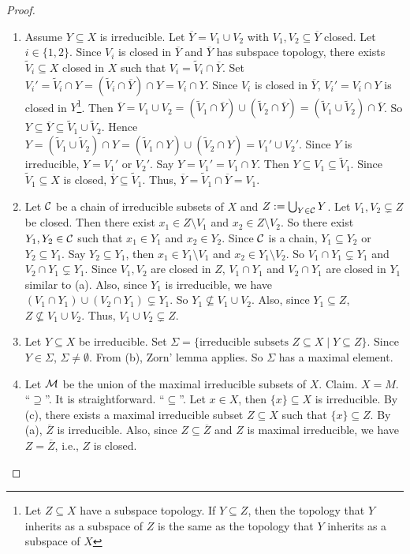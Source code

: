 \begin{proof}
    \begin{enumerate}
        \item Assume $Y \subseteq X$ is irreducible. Let $\overbar Y = V_1 \cup V_2$ with $V_1,V_2 \subseteq \overbar Y$ closed. Let $i \in \{1,2\}$. Since $V_i$ is closed in $\overbar Y$ and $\overbar Y$ has subspace topology, there exists $\widetilde V_i \subseteq X$ closed in $X$ such that $V_i = \widetilde V_i \cap \overbar Y$. Set $V_i' = \widetilde V_i \cap Y = (\widetilde V_i \cap \overbar Y) \cap Y = V_i \cap Y$. Since $V_i$ is closed in $\overbar Y$, $V_i' = V_i \cap Y$ is closed in $Y$\footnote[2]{Let $Z \subseteq X$ have a subspace topology. If $Y \subseteq Z$, then the topology that $Y$ inherits as a subspace of $Z$ is the same as the topology that $Y$ inherits as a subspace of $X$}. Then $\overbar Y = V_1 \cup V_2 = (\widetilde V_1 \cap \overbar Y) \cup (\widetilde V_2 \cap \overbar Y) = (\widetilde V_1 \cup \widetilde V_2) \cap \overbar Y$. So $Y \subseteq \overbar Y \subseteq \widetilde V_1 \cup \widetilde V_2$. Hence $Y = (\widetilde V_1 \cup \widetilde V_2) \cap Y= (\widetilde V_1 \cap Y) \cup (\widetilde V_2 \cap Y) = V_1' \cup V_2'$. Since $Y$ is irreducible, $Y = V_1'$ or $V_2'$. Say $Y = V_1' = V_1 \cap Y$. Then $Y \subseteq V_1 \subseteq \widetilde V_1$. Since $\widetilde V_1 \subseteq X$ is closed, $\overbar Y \subseteq \widetilde V_1$. Thus, $\overbar Y = \widetilde V_1 \cap \overbar Y = V_1$. 
        \item 
            Let $\mathcal{C}$ be a chain of irreducible subsets of $X$ and $Z: = \bigcup_{Y \in \mathcal{C}}Y$. Let $V_1,V_2 \subsetneq Z$ be closed. Then there exist $x_1 \in Z \setminus V_1$ and $x_2 \in Z \setminus V_2$. So there exist $Y_1,Y_2 \in \mathcal{C}$ such that $x_1 \in Y_1$ and $x_2 \in Y_2$. Since $\mathcal{C}$ is a chain, $Y_1 \subseteq Y_2$ or $Y_2 \subseteq Y_1$. Say $Y_2 \subseteq Y_1$, then $x_1 \in Y_1 \setminus V_1$ and $x_2 \in Y_1 \setminus V_2$. So $V_1 \cap Y_1 \subsetneq Y_1$ and $V_2 \cap Y_1 \subsetneq Y_1$. Since $V_1,V_2$ are closed in $Z$, $V_1 \cap Y_1$ and $V_2 \cap Y_1$ are closed in $Y_1$ similar to (a). Also, since $Y_1$ is irreducible, we have $(V_1 \cap Y_1) \cup (V_2 \cap Y_1) \subsetneq Y_1$. So $Y_1 \not \subseteq V_1 \cup V_2$. Also, since $Y_1 \subseteq Z$, $Z \not \subseteq V_1 \cup V_2$. Thus, $V_1 \cup V_2 \subsetneq Z$.
        \item Let $Y \subseteq X$ be irreducible. Set $\Sigma = \{\text{irreducible subsets }Z \subseteq X \mid Y \subseteq Z\}$. Since $Y \in \Sigma$, $\Sigma \neq \emptyset$. From (b), Zorn' lemma applies. So $\Sigma$ has a maximal element.
    \item Let $\mathcal{M}$ be the union of the maximal irreducible subsets of $X$. Claim. $X = M$. ``$\supseteq$''. It is straightforward. ``$\subseteq$''. Let $x \in X$, then $\{x\} \subseteq X$ is irreducible. By (c), there exists a maximal irreducible subset $Z \subseteq X$ such that $\{x\} \subseteq Z$. By (a), $\overbar Z$ is irreducible. Also, since $Z \subseteq \overbar Z$ and $Z$ is maximal irreducible, we have $Z = \overbar Z$, i.e., $Z$ is closed. \qedhere
    \end{enumerate}
\end{proof}

